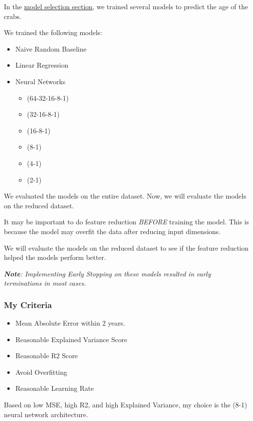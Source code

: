 \documentclass[11pt]{article}
\providecommand{\tightlist}{%
      \setlength{\itemsep}{0pt}\setlength{\parskip}{0pt}}
\begin{document}
In the \href{../1-model/model.ipynb}{model selection section}, we
trained several models to predict the age of the crabs.

We trained the following models:

\begin{itemize}
\tightlist
\item
  Naive Random Baseline
\item
  Linear Regression
\item
  Neural Networks

  \begin{itemize}
  \tightlist
  \item
    (64-32-16-8-1)
  \item
    (32-16-8-1)
  \item
    (16-8-1)
  \item
    (8-1)
  \item
    (4-1)
  \item
    (2-1)
  \end{itemize}
\end{itemize}

We evaluated the models on the entire dataset. Now, we will evaluate the
models on the reduced dataset.

It may be important to do feature reduction \emph{BEFORE} training the
model. This is because the model may overfit the data after reducing
input dimensions.

We will evaluate the models on the reduced dataset to see if the feature
reduction helped the models perform better.

\emph{\textbf{Note}: Implementing Early Stopping on these models
resulted in early terminations in most cases.}

\subsubsection{My Criteria}\label{my-criteria}

\begin{itemize}
\tightlist
\item
  Mean Absolute Error within 2 years.
\item
  Reasonable Explained Variance Score
\item
  Reasonable R2 Score
\item
  Avoid Overfitting
\item
  Reasonable Learning Rate
\end{itemize}

Based on low MSE, high R2, and high Explained Variance, my choice is the
(8-1) neural network architecture.
\end{document}
